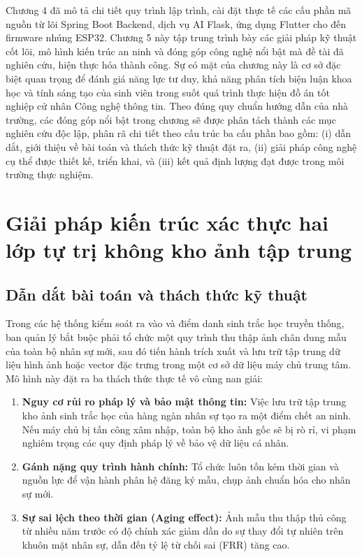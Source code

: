 \documentclass[../DoAn.tex]{subfiles}
\begin{document}
Chương 4 đã mô tả chi tiết quy trình lập trình, cài đặt thực tế các cấu phần mã nguồn từ lõi Spring Boot Backend, dịch vụ AI Flask, ứng dụng Flutter cho đến firmware nhúng ESP32. Chương 5 này tập trung trình bày các giải pháp kỹ thuật cốt lõi, mô hình kiến trúc an ninh và đóng góp công nghệ nổi bật mà đề tài đã nghiên cứu, hiện thực hóa thành công. Sự có mặt của chương này là cơ sở đặc biệt quan trọng để đánh giá năng lực tư duy, khả năng phân tích biện luận khoa học và tính sáng tạo của sinh viên trong suốt quá trình thực hiện đồ án tốt nghiệp cử nhân Công nghệ thông tin. Theo đúng quy chuẩn hướng dẫn của nhà trường, các đóng góp nổi bật trong chương sẽ được phân tách thành các mục nghiên cứu độc lập, phân rã chi tiết theo cấu trúc ba cấu phần bao gồm: (i) dẫn dắt, giới thiệu về bài toán và thách thức kỹ thuật đặt ra, (ii) giải pháp công nghệ cụ thể được thiết kế, triển khai, và (iii) kết quả định lượng đạt được trong môi trường thực nghiệm.

\section{Giải pháp kiến trúc xác thực hai lớp tự trị không kho ảnh tập trung}
\label{section:5.1}

\subsection{Dẫn dắt bài toán và thách thức kỹ thuật}

Trong các hệ thống kiểm soát ra vào và điểm danh sinh trắc học truyền thống, ban quản lý bắt buộc phải tổ chức một quy trình thu thập ảnh chân dung mẫu của toàn bộ nhân sự mới, sau đó tiến hành trích xuất và lưu trữ tập trung dữ liệu hình ảnh hoặc vector đặc trưng trong một cơ sở dữ liệu máy chủ trung tâm. Mô hình này đặt ra ba thách thức thực tế vô cùng nan giải:
\begin{enumerate}
    \item \textbf{Nguy cơ rủi ro pháp lý và bảo mật thông tin:} Việc lưu trữ tập trung kho ảnh sinh trắc học của hàng ngàn nhân sự tạo ra một điểm chết an ninh. Nếu máy chủ bị tấn công xâm nhập, toàn bộ kho ảnh gốc sẽ bị rò rỉ, vi phạm nghiêm trọng các quy định pháp lý về bảo vệ dữ liệu cá nhân.
    \item \textbf{Gánh nặng quy trình hành chính:} Tổ chức luôn tốn kém thời gian và nguồn lực để vận hành phân hệ đăng ký mẫu, chụp ảnh chuẩn hóa cho nhân sự mới.
    \item \textbf{Sự sai lệch theo thời gian (Aging effect):} Ảnh mẫu thu thập thủ công từ nhiều năm trước có độ chính xác giảm dần do sự thay đổi tự nhiên trên khuôn mặt nhân sự, dẫn đến tỷ lệ từ chối sai (FRR) tăng cao.
\end{enumerate}
\end{document}
